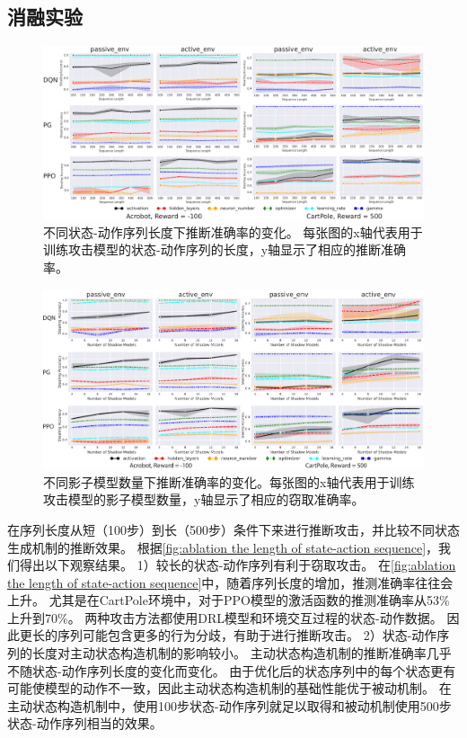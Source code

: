 \subsection{消融实验}
\label{sec:ablation study}
\begin{figure}[!t]
    \centering        
    \includegraphics[width=\hsize]{figure/drl_hypertheif/sequence_length/sequence_length-2.pdf}
    \caption{不同状态-动作序列长度下推断准确率的变化。
    每张图的x轴代表用于训练攻击模型的状态-动作序列的长度，y轴显示了相应的推断准确率。
    }
    \label{fig:ablation the length of state-action sequence}
\end{figure}
\begin{figure}[!t]
    \centering
    \includegraphics[width=\hsize]{figure/drl_hypertheif/shadow_agent_amount/shadow_agent_amount-2.pdf}
    \caption{不同影子模型数量下推断准确率的变化。每张图的x轴代表用于训练攻击模型的影子模型数量，y轴显示了相应的窃取准确率。
    }
    \label{fig:ablation the amount of shadow models}
\end{figure}
\sysname 在序列长度从短（100步）到长（500步）条件下来进行推断攻击，并比较不同状态生成机制的推断效果。
根据\autoref{fig:ablation the length of state-action sequence}，我们得出以下观察结果。
1）较长的状态-动作序列有利于窃取攻击。
在\autoref{fig:ablation the length of state-action sequence}中，随着序列长度的增加，推测准确率往往会上升。
尤其是在CartPole环境中，对于PPO模型的激活函数的推测准确率从53\%上升到70\%。
两种攻击方法都使用DRL模型和环境交互过程的状态-动作数据。
因此更长的序列可能包含更多的行为分歧，有助于进行推断攻击。
2）状态-动作序列的长度对主动状态构造机制的影响较小。
主动状态构造机制的推断准确率几乎不随状态-动作序列长度的变化而变化。
由于优化后的状态序列中的每个状态更有可能使模型的动作不一致，因此主动状态构造机制的基础性能优于被动机制。
在主动状态构造机制中，使用100步状态-动作序列就足以取得和被动机制使用500步状态-动作序列相当的效果。

